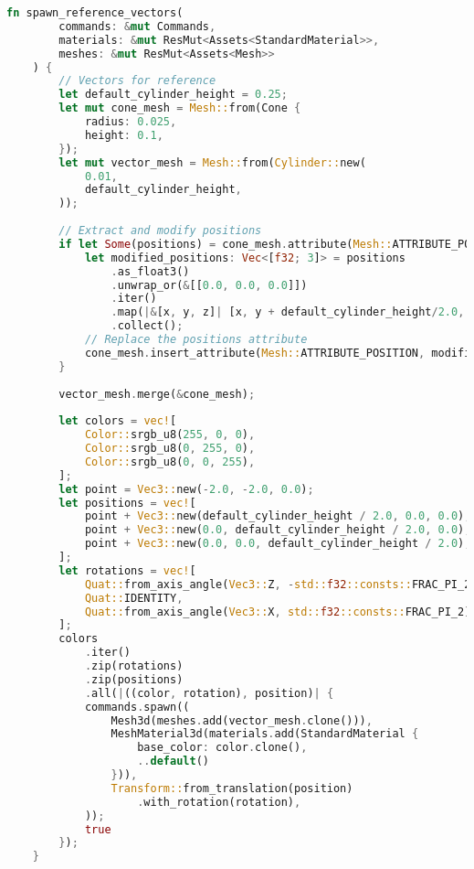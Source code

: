 \begin{lstlisting}[style=mystyle, language=Rust]
    fn spawn_reference_vectors(
        commands: &mut Commands, 
        materials: &mut ResMut<Assets<StandardMaterial>>, 
        meshes: &mut ResMut<Assets<Mesh>>
    ) {
        // Vectors for reference
        let default_cylinder_height = 0.25;
        let mut cone_mesh = Mesh::from(Cone {
            radius: 0.025,
            height: 0.1,
        });
        let mut vector_mesh = Mesh::from(Cylinder::new(
            0.01,
            default_cylinder_height,
        ));
    
        // Extract and modify positions
        if let Some(positions) = cone_mesh.attribute(Mesh::ATTRIBUTE_POSITION) {
            let modified_positions: Vec<[f32; 3]> = positions
                .as_float3()
                .unwrap_or(&[[0.0, 0.0, 0.0]])
                .iter()
                .map(|&[x, y, z]| [x, y + default_cylinder_height/2.0, z]) // cylinder height / 2, to place the cone on top of the cylinder (0 is the center of the cylinder)
                .collect();
            // Replace the positions attribute
            cone_mesh.insert_attribute(Mesh::ATTRIBUTE_POSITION, modified_positions);
        }
    
        vector_mesh.merge(&cone_mesh);
        
        let colors = vec![
            Color::srgb_u8(255, 0, 0),
            Color::srgb_u8(0, 255, 0),
            Color::srgb_u8(0, 0, 255),
        ];
        let point = Vec3::new(-2.0, -2.0, 0.0);
        let positions = vec![
            point + Vec3::new(default_cylinder_height / 2.0, 0.0, 0.0),
            point + Vec3::new(0.0, default_cylinder_height / 2.0, 0.0),
            point + Vec3::new(0.0, 0.0, default_cylinder_height / 2.0),
        ];
        let rotations = vec![
            Quat::from_axis_angle(Vec3::Z, -std::f32::consts::FRAC_PI_2),
            Quat::IDENTITY,
            Quat::from_axis_angle(Vec3::X, std::f32::consts::FRAC_PI_2),
        ];
        colors
            .iter()
            .zip(rotations)
            .zip(positions)
            .all(|((color, rotation), position)| {
            commands.spawn((
                Mesh3d(meshes.add(vector_mesh.clone())),
                MeshMaterial3d(materials.add(StandardMaterial {
                    base_color: color.clone(),
                    ..default()
                })),
                Transform::from_translation(position)
                    .with_rotation(rotation),
            ));
            true
        });
    }
\end{lstlisting}